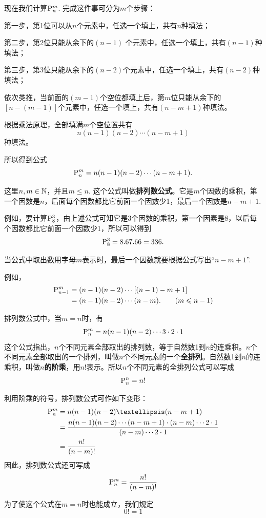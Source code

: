 现在我们计算$\perm{n}{m}$. 完成这件事可分为$m$个步骤：

第一步，第1位可以从$n$个元素中，任选一个填上，共有$n$种填法；

第二步，第2位只能从余下的$(n-1)$ 个元素中，任选一个填上，共有$(n-1)$种填法；

第三步，第3位只能从余下的$( n-2 )$个元素中，任选一个填上，共有$( n-2 )$种填法；

依次类推，当前面的$( m-1 )$个空位都填上后，第$m$位只能从余下的$[ n-(m-1) ]$个元素中，任选一个填上，共有$( n-m+1 )$种填法。

根据乘法原理，全部填满$m$个空位置共有
\[n(n-1)(n-2)\cdots(n-m+1)\]
种填法。

所以得到公式
\[
\perm{n}{m}=n(n-1)(n-2)\cdots(n-m+1).\]

这里$n, m\in \N$，并且$m\le  n$. 这个公式叫做\textbf{排列数公式}。它是$m$个因数的乘积，第一个因数是$n$，后面每个因数都比它前面一个因数少1，最后一个因数是$n-m+1$.

例如，要计算$\perm{8}{3}$，由上述公式可知它是3个因数的乘积，第一个因素是8，以后每个因数都比它前面一个因数少1，所以可以得到
\[\perm{8}{3}=8\x 7\x 6=336.\]

当公式中取出数用字母$m$表示时，最后一个因数就要根据公式写出“$n-m+1$”.

例如， 
\[\begin{split}
\perm{n-1}{m}&=(n-1)(n-2)\cdots[(n-1)-m+1]\\
&=(n-1)(n-2)\cdots(n-m).\qquad  (m\le  n-1)    
\end{split}\]

排列数公式中，当$ m=n $时，有
\[\perm{n}{m}=n(n-1)(n-2)\cdots 3\cdot 2\cdot 1\]
这个公式指出，$n$个不同元素全部取出的排列数，等于自然数1到$n$的连乘积。$n$个不同元素全部取出的一个排列，叫做$n$个不同元素的一个\textbf{全排列}。自然数1到$n$的连乘积，叫做\textbf{$n$的阶乘}，用$n!$表示。所以$n$个不同元素的全排列公式可以写成
\[\perm{n}{n}=n!\]

利用阶乘的符号，排列数公式可作如下变形：
\[\begin{split}
\perm{n}{m}&=n(n-1)(n-2)…(n-m+1)\\
&=\frac{n(n-1)(n-2)\cdots(n-m+1)\cdot(n-m)\cdots 2\cdot 1}{(n-m)\cdots 2\cdot 1}\\
& =\frac{n!}{(n-m)!}
\end{split}\]
因此，排列数公式还可写成
\[
\perm{n}{m}=\frac{n!}{(n-m)!}\]

\begin{remark}
为了使这个公式在$ m=n $时也能成立，我们规定
\[0!=1\]
\end{remark}

